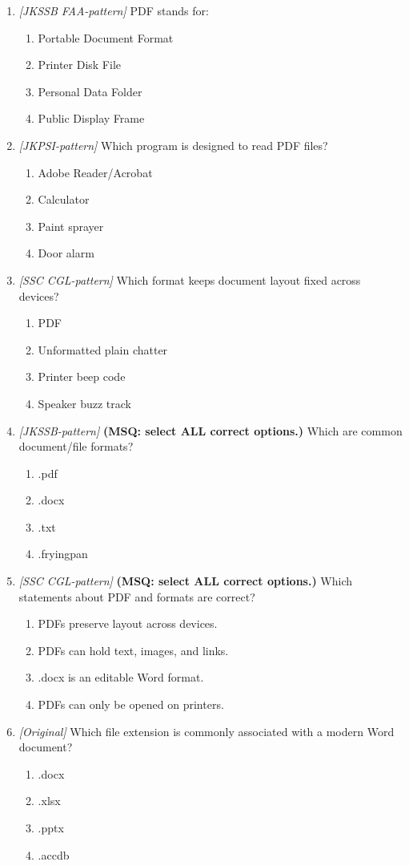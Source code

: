 \begin{enumerate}[label=\textbf{Q\arabic*.}, leftmargin=*]
\item \textit{[JKSSB FAA-pattern]} PDF stands for:
  \begin{enumerate}[label=\Alph*.]
    \item Portable Document Format
    \item Printer Disk File
    \item Personal Data Folder
    \item Public Display Frame
  \end{enumerate}
\item \textit{[JKPSI-pattern]} Which program is designed to read PDF files?
  \begin{enumerate}[label=\Alph*.]
    \item Adobe Reader/Acrobat
    \item Calculator
    \item Paint sprayer
    \item Door alarm
  \end{enumerate}
\item \textit{[SSC CGL-pattern]} Which format keeps document layout fixed across devices?
  \begin{enumerate}[label=\Alph*.]
    \item PDF
    \item Unformatted plain chatter
    \item Printer beep code
    \item Speaker buzz track
  \end{enumerate}
\item \textit{[JKSSB-pattern]} \textbf{(MSQ: select ALL correct options.)} Which are common document/file formats?
  \begin{enumerate}[label=\Alph*.]
    \item .pdf
    \item .docx
    \item .txt
    \item .fryingpan
  \end{enumerate}
\item \textit{[SSC CGL-pattern]} \textbf{(MSQ: select ALL correct options.)} Which statements about PDF and formats are correct?
  \begin{enumerate}[label=\Alph*.]
    \item PDFs preserve layout across devices.
    \item PDFs can hold text, images, and links.
    \item .docx is an editable Word format.
    \item PDFs can only be opened on printers.
  \end{enumerate}
\item \textit{[Original]} Which file extension is commonly associated with a modern Word document?
  \begin{enumerate}[label=\Alph*.]
\item .docx
   \item .xlsx
   \item .pptx
   \item .accdb
  \end{enumerate}


\end{enumerate}
